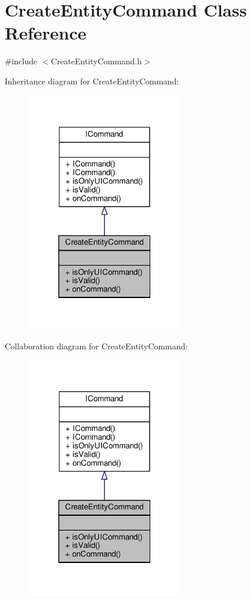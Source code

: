 \hypertarget{class_create_entity_command}{\section{Create\-Entity\-Command Class Reference}
\label{class_create_entity_command}
}


{\ttfamily \#include $<$Create\-Entity\-Command.\-h$>$}



Inheritance diagram for Create\-Entity\-Command\-:
\nopagebreak
\begin{figure}[H]
\begin{center}
\leavevmode
\includegraphics[width=194pt]{class_create_entity_command__inherit__graph}
\end{center}
\end{figure}


Collaboration diagram for Create\-Entity\-Command\-:
\nopagebreak
\begin{figure}[H]
\begin{center}
\leavevmode
\includegraphics[width=194pt]{class_create_entity_command__coll__graph}
\end{center}
\end{figure}
